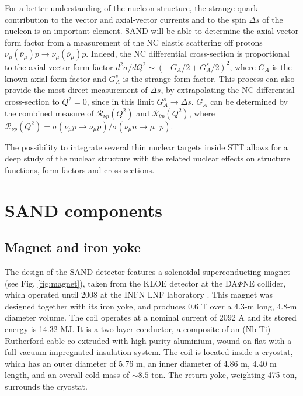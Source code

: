 For a better understanding of the nucleon structure, the strange quark contribution to the vector and axial-vector currents and to the spin $\Delta s$ of the nucleon is an important element. SAND will be able to determine the axial-vector form factor from a measurement of the NC elastic scattering off protons $\nu_\mu (\overline{\nu}_\mu) p \rightarrow \nu_\mu (\overline{\nu}_\mu) p$. Indeed, the NC differential cross-section is proportional to the axial-vector form factor $d^2\sigma / dQ^2 \sim (-G_A/2 + G^s_A/2)^2$, where $G_A$ is the known axial form factor and $G_A^s$ is the strange form factor. This process can also provide the most direct measurement of $\Delta s$, by extrapolating the NC differential cross-section to $Q^2 = 0$, since in this limit $G^s_A \rightarrow \Delta s$. $G_A$ can be determined by the combined measure of $\mathcal{R}_{\nu p} (Q^2)$ and $\mathcal{R}_{\overline{\nu} p} (Q^2)$, where $\mathcal{R}_{\nu p}(Q^2) = \sigma({\nu}_\mu p \rightarrow {\nu}_\mu p)/\sigma(\nu_\mu n \rightarrow \mu^- p)$.%

The possibility to integrate several thin nuclear targets inside STT allows for a deep study of the nuclear structure with the related nuclear effects on structure functions, form factors and cross sections.%

\section{SAND components}
\label{sand-components}
\subsection{Magnet and iron yoke}
The design of the SAND detector features a solenoidal superconducting magnet (see Fig. \ref{fig:magnet}), taken from the KLOE detector at the DA$\Phi$NE collider, which operated until 2008 at the INFN LNF laboratory \cite{KLOE-article}. This magnet was designed together with its iron yoke, and produces 0.6 T over a 4.3-m long, 4.8-m diameter volume. The coil operates at a nominal current of 2092 A and its stored energy is 14.32 MJ. It is a two-layer conductor, a composite of an (Nb-Ti) Rutherford cable co-extruded with high-purity aluminium, wound on flat with a full vacuum-impregnated insulation system. The coil is located inside a cryostat, which has an outer diameter of 5.76 m, an inner diameter of 4.86 m, 4.40 m length,  and an overall cold mass of $\sim 8.5$ ton. The return yoke, weighting 475 ton, surrounds the cryostat.


